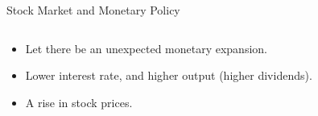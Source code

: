 \documentclass[shownotes,11pt, aspectratio=169]{beamer}
\begin{document}
\begin{frame}{Stock Market and Monetary Policy}
\begin{columns}[T] %
\begin{column}{.36\textwidth}
\begin{itemize}
\item Let there be an unexpected monetary expansion.
\item Lower interest rate, and higher output (higher dividends).
\item A rise in stock prices.
\end{itemize}
\end{column}
\hfill
\pause
\begin{column}{.54\textwidth}
\end{column}
\end{columns}
\end{frame}
\end{document}
